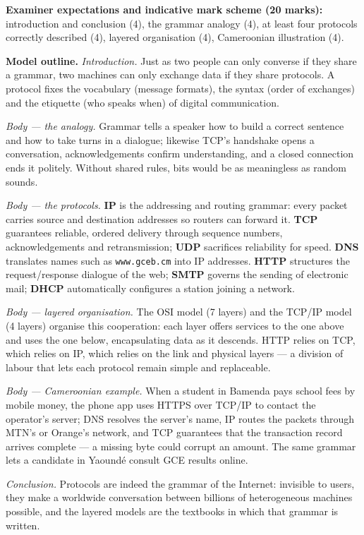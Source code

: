 \documentclass[11pt]{article}
\begin{document}
\begin{corrige}
\textbf{Examiner expectations and indicative mark scheme (20 marks):} introduction and conclusion (4), the grammar analogy (4), at least four protocols correctly described (4), layered organisation (4), Cameroonian illustration (4).

\textbf{Model outline.}
\emph{Introduction.} Just as two people can only converse if they share a grammar, two machines can only exchange data if they share protocols. A protocol fixes the vocabulary (message formats), the syntax (order of exchanges) and the etiquette (who speaks when) of digital communication.

\emph{Body — the analogy.} Grammar tells a speaker how to build a correct sentence and how to take turns in a dialogue; likewise TCP's handshake opens a conversation, acknowledgements confirm understanding, and a closed connection ends it politely. Without shared rules, bits would be as meaningless as random sounds.

\emph{Body — the protocols.} \textbf{IP} is the addressing and routing grammar: every packet carries source and destination addresses so routers can forward it. \textbf{TCP} guarantees reliable, ordered delivery through sequence numbers, acknowledgements and retransmission; \textbf{UDP} sacrifices reliability for speed. \textbf{DNS} translates names such as \texttt{www.gceb.cm} into IP addresses. \textbf{HTTP} structures the request/response dialogue of the web; \textbf{SMTP} governs the sending of electronic mail; \textbf{DHCP} automatically configures a station joining a network.

\emph{Body — layered organisation.} The OSI model (7 layers) and the TCP/IP model (4 layers) organise this cooperation: each layer offers services to the one above and uses the one below, encapsulating data as it descends. HTTP relies on TCP, which relies on IP, which relies on the link and physical layers — a division of labour that lets each protocol remain simple and replaceable.

\emph{Body — Cameroonian example.} When a student in Bamenda pays school fees by mobile money, the phone app uses HTTPS over TCP/IP to contact the operator's server; DNS resolves the server's name, IP routes the packets through MTN's or Orange's network, and TCP guarantees that the transaction record arrives complete — a missing byte could corrupt an amount. The same grammar lets a candidate in Yaoundé consult GCE results online.

\emph{Conclusion.} Protocols are indeed the grammar of the Internet: invisible to users, they make a worldwide conversation between billions of heterogeneous machines possible, and the layered models are the textbooks in which that grammar is written.
\end{corrige}
\end{document}
